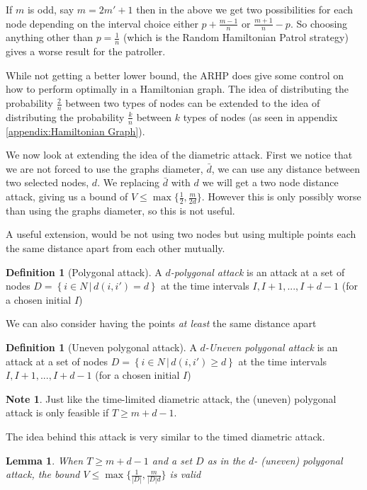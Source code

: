\documentclass[a4paper,10pt]{article}
\newcommand{\set}[2]{\left\{ #1 \, | \, #2 \right\}}
\newtheorem{lemma}[theorem]{Lemma}
\theoremstyle{definition}
\newtheorem{definition}[theorem]{Definition}
\theoremstyle{definition}
\theoremstyle{remark}
\theoremstyle{definition}
\newtheorem*{note}{Note}
\begin{document}
If $m$ is odd, say $m=2m'+1$ then in the above we get two possibilities for each node depending on the interval choice either $p+\frac{m-1}{n}$ or $\frac{m+1}{n}-p$. So choosing anything other than $p=\frac{1}{n}$ (which is the Random Hamiltonian Patrol strategy) gives a worse result for the patroller.

While not getting a better lower bound, the ARHP does give some control on how to perform optimally in a Hamiltonian graph. The idea of distributing the probability $\frac{2}{n}$ between two types of nodes can be extended to the idea of distributing the probability $\frac{k}{n}$ between $k$ types of nodes (as seen in appendix \ref{appendix:Hamiltonian Graph}).


We now look at extending the idea of the diametric attack. First we notice that we are not forced to use the graphs diameter, $\bar{d}$, we can use any distance between two selected nodes, $d$. We replacing $\bar{d}$ with $d$ we will get a two node distance attack, giving us a bound of $V \leq \max \{\frac{1}{2} ,\frac{m}{2d} \}$. However this is only possibly worse than using the graphs diameter, so this is not useful.

A useful extension, would be not using two nodes but using multiple points each the same distance apart from each other mutually.

\begin{definition}[Polygonal attack]
A \textit{$d$-polygonal attack} is an attack at a set of nodes $D= \set{i \in N}{ d(i,i')=d}$ at the time intervals $I,I+1,...,I+d-1$ (for a chosen initial $I$)
\end{definition}

We can also consider having the points \textit{at least} the same distance apart

\begin{definition}[Uneven polygonal attack]
A \textit{$d$-Uneven polygonal attack} is an attack at a set of nodes $D= \set{i \in N}{ d(i,i') \geq d}$ at the time intervals $I,I+1,...,I+d-1$ (for a chosen initial $I$)
\end{definition}

\begin{note}
Just like the time-limited diametric attack, the (uneven) polygonal attack is only feasible if $T \geq m+d-1$.
\end{note}

The idea behind this attack is very similar to the timed diametric attack.

\begin{lemma}
When $T \geq m+d-1$ and a set $D$ as in the $d$- (uneven) polygonal attack, the bound $V \leq \max \{ \frac{1}{|D|} , \frac{m}{|D|d} \}$ is valid
\end{lemma}
\end{document}
